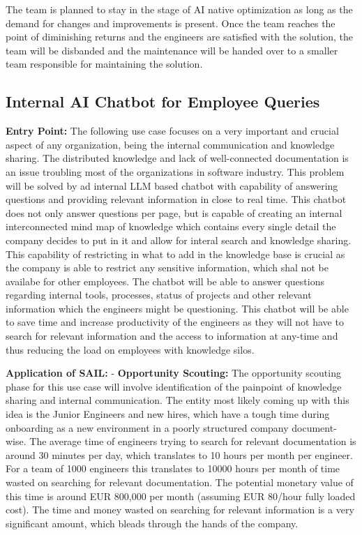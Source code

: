 \documentclass[]{imc-inf}
\begin{document}
The team is planned to stay in the stage of AI native optimization as long as the demand for changes and improvements is present. Once the team reaches the point of diminishing returns and the engineers are satisfied with the solution, the team will be disbanded and the maintenance will be handed over to a smaller team responsible for maintaining the solution.



\subsection{Internal AI Chatbot for Employee
	Queries}\label{internal-ai-chatbot-for-employee-queries}

\textbf{Entry Point:} The following use case focuses on a very important and crucial aspect of any organization, being the internal communication and knowledge sharing. The distributed knowledge and lack of well-connected documentation is an issue troubling most of the organizations in software industry. This problem will be solved by ad internal LLM based chatbot with capability of answering questions and providing relevant information in close to real time. This chatbot does not only answer questions per page, but is capable of creating an internal interconnected mind map of knowledge which contains every single detail the company decides to put in it and allow for interal search and knowledge sharing. This capability of restricting in what to add in the knowledge base is crucial as the company is able to restrict any sensitive information, which shal not be availabe for other employees. The chatbot will be able to answer questions regarding internal tools, processes, status of projects and other relevant information which the engineers might be questioning. This chatbot will be able to save time and increase productivity of the engineers as they will not have to search for relevant information and the access to information at any-time and thus reducing the load on employees with knowledge silos.

\textbf{Application of SAIL:} - \textbf{Opportunity Scouting:} The opportunity scouting phase for this use case will involve identification of the painpoint of knowledge sharing and internal communication. The entity most likely coming up with this idea is the Junior Engineers and new hires, which have a tough time during onboarding as a new environment in a poorly structured company document-wise. The average time of engineers trying to search for relevant documentation is around 30 minutes per day, which translates to 10 hours per month per engineer. For a team of 1000 engineers this translates to 10000 hours per month of time wasted on searching for relevant documentation. The potential monetary value of this time is around EUR 800,000 per month (assuming EUR 80/hour fully loaded cost). The time and money wasted on searching for relevant information is a very significant amount, which bleads through the hands of the company.
\end{document}
